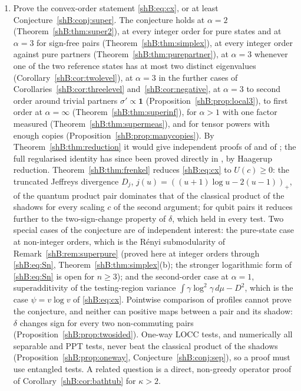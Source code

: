 \begin{enumerate}[leftmargin=1.5em]
\item Prove the convex-order statement \eqref{shB:eq:cx}, or at least Conjecture~\ref{shB:conj:super}. The conjecture holds at $\alpha=2$ (Theorem~\ref{shB:thm:super2}), at every integer order for pure states and at $\alpha=3$ for sign-free pairs (Theorem~\ref{shB:thm:simplex}), at every integer order against pure partners (Theorem~\ref{shB:thm:purepartner}), at $\alpha=3$ whenever one of the two reference states has at most two distinct eigenvalues (Corollary~\ref{shB:cor:twolevel}), at $\alpha=3$ in the further cases of Corollaries~\ref{shB:cor:threelevel} and~\ref{shB:cor:negative}, at $\alpha=3$ to second order around trivial partners $\sigma'\propto\mathbf 1$ (Proposition~\ref{shB:prop:local3}), to first order at $\alpha=\infty$ (Theorem~\ref{shB:thm:superinf}), for $\alpha>1$ with one factor measured (Theorem~\ref{shB:thm:supermeas}), and for tensor powers with enough copies (Proposition~\ref{shB:prop:manycopies}). By Theorem~\ref{shB:thm:reduction} it would give independent proofs of \cite{LiuHircheCheng2025} and of \cite[(1.10)]{BeigiHircheTomamichel2025}; the full regularised identity has since been proved directly in \cite{HMT2026}, by Haagerup reduction. Theorem~\ref{shB:thm:frenkel} reduces \eqref{shB:eq:cx} to $U(c)\ge0$: the truncated Jeffreys divergence $D_j$, $j(u)=((u+1)\log u-2(u-1))_+$, of the quantum product pair dominates that of the classical product of the shadows for every scaling $c$ of the second argument; for qubit pairs it reduces further to the two-sign-change property of $\delta$, which held in every test. Two special cases of the conjecture are of independent interest: the pure-state case at non-integer orders, which is the R\'enyi submodularity of Remark~\ref{shB:rem:superpure} (proved here at integer orders through \eqref{shB:eq:Sn}, Theorem~\ref{shB:thm:simplex}(b); the stronger logarithmic form of \eqref{shB:eq:Sn} is open for $n\ge3$); and the second-order case at $\alpha=1$, superadditivity of the testing-region variance $\int\gamma\log^2\gamma\,d\mu-D^2$, which is the case $\psi=v\log v$ of \eqref{shB:eq:cx}. Pointwise comparison of profiles cannot prove the conjecture, and neither can positive maps between a pair and its shadow: $\delta$ changes sign for every two non-commuting pairs (Proposition~\ref{shB:prop:twosided}). One-way LOCC tests, and numerically all separable and PPT tests, never beat the classical product of the shadows (Proposition~\ref{shB:prop:oneway}, Conjecture~\ref{shB:conj:sep}), so a proof must use entangled tests. A related question is a direct, non-greedy operator proof of Corollary~\ref{shB:cor:bathtub} for $\kappa>2$.

\end{enumerate}
